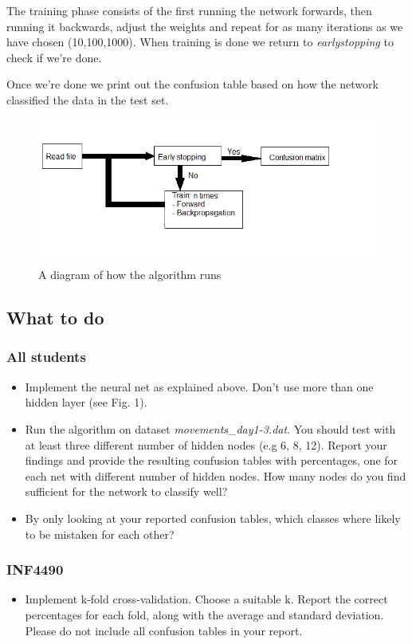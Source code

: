 \documentclass{article}           %
\begin{document}
The training phase consists of the first running the network forwards, then running it backwards, adjust the weights and repeat for as many iterations as we have chosen (10,100,1000). When training is done we return to \emph{earlystopping} to check if we're done.

Once we're done we print out the confusion table based on how the network classified the data in the test set.

\begin{figure}[h]
    \centering
    \includegraphics[scale=0.5]{figures/diagram.png}
    \caption{A diagram of how the algorithm runs}
    \label{fig:awesome_image}
\end{figure}

\subsection*{What to do}

\subsubsection*{All students}
\begin{itemize}
\item Implement the neural net as explained above. Don't use more than one hidden layer (see Fig. 1).
\item Run the algorithm on dataset \emph{movements\_day1-3.dat}. You should test with at least three different number of hidden nodes (e.g 6, 8, 12). Report your findings and provide the resulting confusion tables with percentages, one for each net with different number of hidden nodes. How many nodes do you find sufficient for the network to classify well?
\item By only looking at your reported confusion tables, which classes where likely to be mistaken for each other?
\end{itemize}

\subsubsection*{INF4490}
\begin{itemize}
\item Implement k-fold cross-validation. Choose a suitable k. Report the correct percentages for each fold, along with the average and standard deviation. Please do not include all confusion tables in your report.
\end{itemize}
\end{document}
